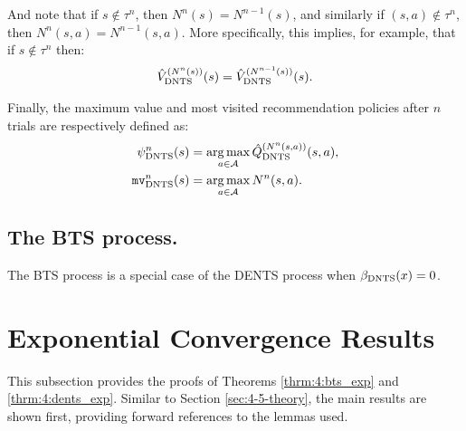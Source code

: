     And note that if $s\not\in\tau^n$, then $N^n(s)=N^{n-1}(s)$, and similarly if $(s,a)\not\in\tau^n$, then $N^n(s,a)=N^{n-1}(s,a)$. More specifically, this implies, for example, that if $s\not\in\tau^n$ then:
    \begin{align}
        {\hat{V}^{(N^n(s))}_{{\textnormal{DNTS}}}}(s) = {\hat{V}^{(N^{n-1}(s))}_{{\textnormal{DNTS}}}}(s).
    \end{align}

    Finally, the maximum value and most visited recommendation policies after $n$ trials are respectively defined as:
    \begin{align}
        {\psi^{n}_{{\textnormal{DNTS}}}}(s) &= \operatorname*{arg\,max}_{a\in\mathcal{A}}{\hat{Q}^{(N^n(s,a))}_{{\textnormal{DNTS}}}}(s,a), \\
        {\textup{\texttt{mv}}^{n}_{{\textnormal{DNTS}}}}(s) &= \operatorname*{arg\,max}_{a\in\mathcal{A}} N^n(s,a).
    \end{align}

    








    \subsection{The BTS process.}

        The \mbox{BTS} process is a special case of the \mbox{DENTS} process when ${\beta_{{\textnormal{DNTS}}}}(x)=0$. 




        












\section{Exponential Convergence Results}
\label{appsec:exp}

    This subsection provides the proofs of Theorems \ref{thrm:4:bts_exp} and \ref{thrm:4:dents_exp}. Similar to Section \ref{sec:4-5-theory}, the main results are shown first, providing forward references to the lemmas used.

